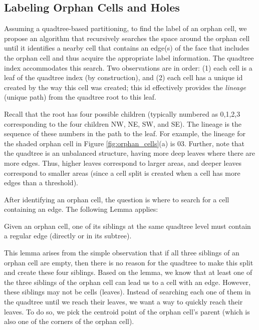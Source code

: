 \subsection{Labeling Orphan Cells and Holes} \label{sec:anomalies}
Assuming a quadtree-based partitioning, to find the label of an orphan cell, we propose an algorithm that recursively searches the space around the orphan cell
until it identifies a nearby cell that contains an edge(s) of the face that includes the orphan cell and thus acquire the appropriate label information. The 
quadtree index accommodates this search. Two observations are in order: (1) each cell is a leaf of the quadtree index (by construction), and (2) each cell has a 
unique id created by the way this cell was created; this id effectively provides the \textit{lineage} (unique path) from the quadtree root to this leaf.

Recall that the root has four possible children (typically numbered as 0,1,2,3 corresponding to the four children NW, NE, SW, and SE). The lineage is the 
sequence of these numbers in the path to the leaf. For example, the lineage for the shaded orphan cell in Figure \ref{fig:orphan_cells}(a) is 03. Further, note 
that the quadtree is an unbalanced structure, having more deep leaves where there are more edges. Thus, higher leaves correspond to larger areas, and deeper 
leaves correspond to smaller areas (since a cell split is created when a cell has more edges than a threshold).

After identifying an orphan cell, the question
is where to search for a cell containing an edge. The following Lemma applies:

\begin{lemma} %
Given an orphan cell, one of its siblings at the same quadtree level must contain a regular edge (directly or in its subtree). 
\end{lemma}

This lemma arises from the simple observation that if all three siblings of an orphan cell are empty, then there is no reason for the quadtree to make this split and create these four siblings. Based on the lemma, we know that at least one of the three siblings of the orphan cell can lead us to a cell with an edge.   However, these siblings may not be cells (leaves). Instead of searching each one of them in the quadtree until we reach their leaves, we want a way to quickly reach their leaves. To do so, we pick the centroid point of the orphan cell's parent (which is also one of the corners of the orphan cell).

